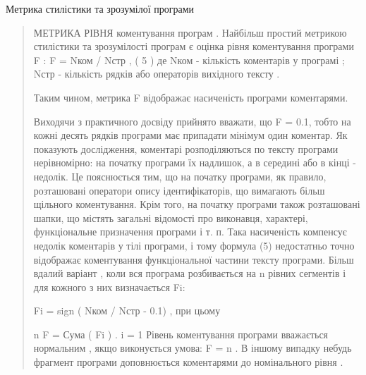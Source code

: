 Метрика стилістики та зрозумілої програми
\begin{quote}

МЕТРИКА РІВНЯ коментування програм .
Найбільш простий метрикою стилістики та зрозумілості програм є оцінка рівня коментування програми F :
F = Nком / Nстр , ( 5 )
де Nком - кількість коментарів у програмі ; Nстр - кількість рядків або операторів вихідного тексту .

Таким чином, метрика F відображає насиченість програми коментарями.

Виходячи з практичного досвіду прийнято вважати, що F = 0.1, тобто на кожні десять рядків програми має припадати мінімум один коментар. Як показують дослідження, коментарі розподіляються по тексту програми нерівномірно: на початку програми їх надлишок, а в середині або в кінці - недолік. Це пояснюється тим, що на початку програми, як правило, розташовані оператори опису ідентифікаторів, що вимагають більш щільного коментування. Крім того, на початку програми також розташовані шапки, що містять загальні відомості про виконавця, характері, функціональне призначення програми і т. п. Така насиченість компенсує недолік коментарів у тілі програми, і тому формула (5) недостатньо точно відображає коментування функціональної частини тексту програми.
Більш вдалий варіант , коли вся програма розбивається на n рівних сегментів і для кожного з них визначається Fi:

Fi = sign ( Nком / Nстр - 0.1) ,
при цьому

n
F = Сума ( Fi ) .
i = 1
Рівень коментування програми вважається нормальним , якщо виконується умова: F = n . В іншому випадку небудь фрагмент програми доповнюється коментарями до номінального рівня .
\end{quote}
